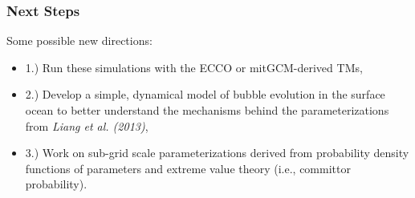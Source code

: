 \documentclass{beamer}
\begin{document}
\begin{frame}
\frametitle{Next Steps}

Some possible new directions: \par\vspace{0.2cm}

\begin{itemize}
	\item 1.) Run these simulations with the ECCO or mitGCM-derived TMs,
	\item 2.) Develop a simple, dynamical model of bubble evolution in the surface ocean to better understand the mechanisms behind the parameterizations from \emph{Liang et al. (2013)},
	\item 3.) Work on sub-grid scale parameterizations derived from probability density functions of parameters and extreme value theory (i.e., committor probability).
\end{itemize}

\end{frame}
\end{document}
